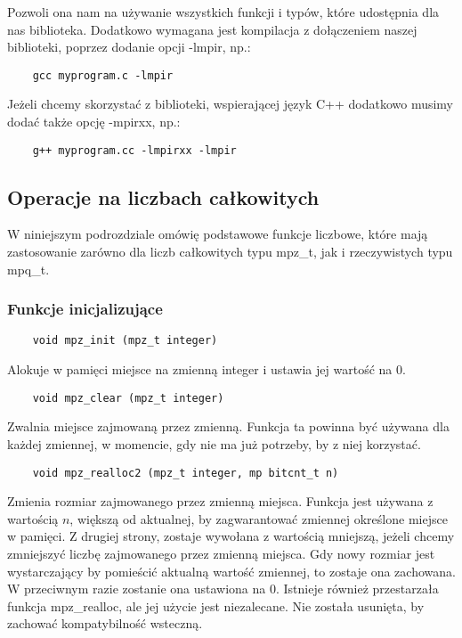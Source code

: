 \documentclass[oneside,a4paper]{book}
\begin{document}
	Pozwoli ona nam na używanie wszystkich funkcji i typów, które udostępnia dla nas biblioteka. Dodatkowo wymagana jest kompilacja z dołączeniem naszej biblioteki, poprzez dodanie opcji -lmpir, np.:
	\begin{lstlisting}
	gcc myprogram.c -lmpir
	\end{lstlisting}
	
	Jeżeli chcemy skorzystać z biblioteki, wspierającej język C++ dodatkowo musimy dodać także opcję -mpirxx, np.:
	\begin{lstlisting}
	g++ myprogram.cc -lmpirxx -lmpir
	\end{lstlisting}
	
	\subsection{Operacje na liczbach całkowitych}
	W niniejszym podrozdziale omówię podstawowe funkcje liczbowe, które mają zastosowanie zarówno dla liczb całkowitych typu mpz\_t, jak i rzeczywistych typu mpq\_t.
	
	\subsubsection{Funkcje inicjalizujące}
	\begin{lstlisting}
	void mpz_init (mpz_t integer)
	\end{lstlisting}
	
	Alokuje w pamięci miejsce na zmienną integer i ustawia jej wartość na $0$.
	
	\begin{lstlisting}
	void mpz_clear (mpz_t integer)
	\end{lstlisting}
	
	Zwalnia miejsce zajmowaną przez zmienną. Funkcja ta powinna być używana dla każdej zmiennej, w momencie, gdy nie ma już potrzeby, by z niej korzystać.
	
	\begin{lstlisting}
	void mpz_realloc2 (mpz_t integer, mp bitcnt_t n)
	\end{lstlisting}
	
	Zmienia rozmiar zajmowanego przez zmienną miejsca. Funkcja jest używana z wartością $n$, większą od aktualnej, by zagwarantować zmiennej określone miejsce w pamięci. Z drugiej strony, zostaje wywołana z wartością mniejszą, jeżeli chcemy zmniejszyć liczbę zajmowanego przez zmienną miejsca. Gdy nowy rozmiar jest wystarczający by pomieścić aktualną wartość zmiennej, to zostaje ona zachowana. W przeciwnym razie zostanie ona ustawiona na $0$. Istnieje również przestarzała funkcja mpz\_realloc, ale jej użycie jest niezalecane. Nie została usunięta, by zachować kompatybilność wsteczną.
	
\end{document}
